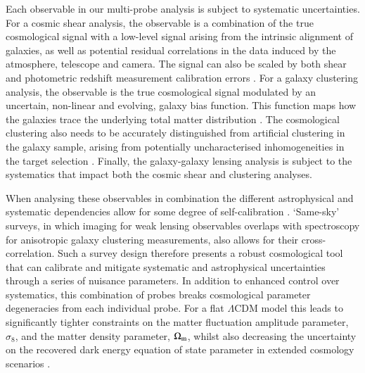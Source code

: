 Each observable in our multi-probe analysis is subject to systematic
uncertainties.  For a cosmic shear analysis, the observable is a
combination of the true cosmological signal with a low-level signal
arising from the intrinsic alignment of galaxies, as well as potential residual
correlations in the data induced by the atmosphere, telescope and
camera.   The signal can also be scaled by both shear
 and photometric redshift measurement calibration errors
 \citep[see][and references therein]{mandelbaum:2018}.   For a galaxy
   clustering analysis, the observable is the true
   cosmological signal modulated by an uncertain, non-linear and
   evolving, galaxy bias function.  This function maps how
   the galaxies trace the
   underlying total matter distribution \citep[see][and references
   therein]{desjacques/etal:2018}. 
   The cosmological clustering
   also needs to be accurately distinguished from artificial clustering in the galaxy sample,
   arising from potentially uncharacterised inhomogeneities in the target selection \citep[see for example][]{ross/etal:2012}. 
   Finally, the galaxy-galaxy
   lensing analysis is subject to the systematics that impact both the
   cosmic shear and clustering analyses.

   When analysing these
   observables in combination
   the different astrophysical and systematic dependencies allow for some degree of
   self-calibration \citep{bernstein/jain:2004, hu/jain:2004,
     bernstein:2009,joachimi/bridle:2010}.  `Same-sky'
   surveys, in which imaging for weak lensing observables overlaps with
   spectroscopy for anisotropic galaxy clustering measurements,
   also allows for their cross-correlation.  Such a survey design therefore
   presents a robust
   cosmological tool that can calibrate and mitigate systematic and astrophysical
   uncertainties through a series of nuisance parameters.   In
   addition to enhanced control over systematics, this combination of probes
   breaks cosmological parameter degeneracies from each individual
   probe. 
   For a flat $\Lambda$CDM model
   this leads to significantly tighter constraints on the matter fluctuation amplitude 
   parameter, $\sigma_8$, and the matter density parameter, $\Omega_{\rm m}$, whilst also decreasing the
   uncertainty on the recovered dark energy equation of state
   parameter in extended cosmology scenarios \citep{hu/jain:2004,gaztanaga/etal:2012}.
   
